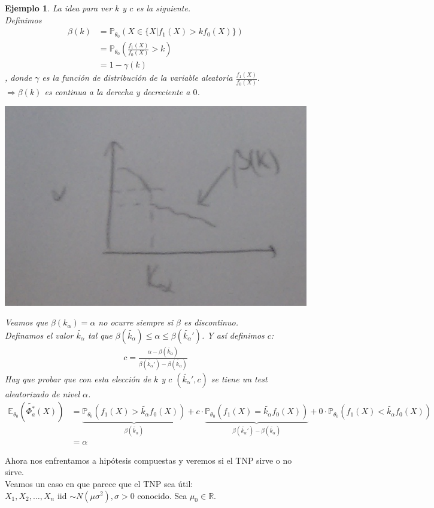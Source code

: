 \documentclass[10pt]{article}
\theoremstyle{plain}
\newtheorem{ej}{Ejemplo}
\theoremstyle{definition}
\begin{document}
\begin{ej}
La idea para ver $k$ y $c$ es la siguiente.\\
Definimos
\begin{align*}
\beta (k) &= \mathbb{P}_{\theta_{0}}\left(X \in \{X| f_{1}(X) > kf_{0}(X)\}\right)\\
&= \mathbb{P}_{\theta_{0}}\left(\frac{f_{1}(X)}{f_{0}(X)}>k\right) \\
&= 1- \gamma (k)
\end{align*}
, donde $\gamma$ es la función de distribución de la variable aleatoria $\frac{f_{1}(X)}{f_{0}(X)}$.\\
$\Rightarrow \beta (k)$ es continua a la derecha y decreciente a $0$.
\begin{center}
\includegraphics[scale=0.2]{imagenes/aleatorizado.png}
\end{center}
Veamos que $\beta (k_{\alpha}) = \alpha$ no ocurre siempre si $\beta$ es discontinuo.\\

Definamos el valor $\tilde{k_{\alpha}}$ tal que $\beta (\tilde{k_{\alpha}}) \le \alpha \le \beta (\tilde{k_{\alpha}}')$. Y así definimos $c$:
\begin{align*}
c = \frac{\alpha - \beta (\tilde{k_{\alpha}})}{\beta (\tilde{k_{\alpha}}') - \beta (\tilde{k_{\alpha}})}
\end{align*}
Hay que probar que con esta elección de $k$ y $c$ $(\tilde{k_{\alpha}}',c)$ se tiene un test aleatorizado de nivel $\alpha$.
\begin{align*}
\mathbb{E}_{\theta_{0}}(\tilde{\Phi_{a}^*}(X)) &= \underbrace{\mathbb{P}_{\theta_{0}}(f_{1}(X)>\tilde{k_{\alpha}}f_{0}(X))}_{\beta (\tilde{k_{\alpha}})}+ c\cdot\underbrace{\mathbb{P}_{\theta_{0}}(f_{1}(X)=\tilde{k_{\alpha}}f_{0}(X))}_{\beta (\tilde{k_{\alpha}}')-\beta (\tilde{k_{\alpha}})}+ 0\cdot\mathbb{P}_{\theta_{0}}(f_{1}(X)<\tilde{k_{\alpha}}f_{0}(X))\\
&= \alpha
\end{align*}
\end{ej}
Ahora nos enfrentamos a hipótesis compuestas y veremos si el TNP sirve o no sirve.\\
Veamos un caso en que parece que el TNP sea útil:\\
$X_{1},X_{2},\ldots, X_{n}$ iid $\sim N(\mu \sigma^2), \sigma>0$ conocido. Sea $\mu_{0} \in \mathbb{R}$.\\
\end{document}
